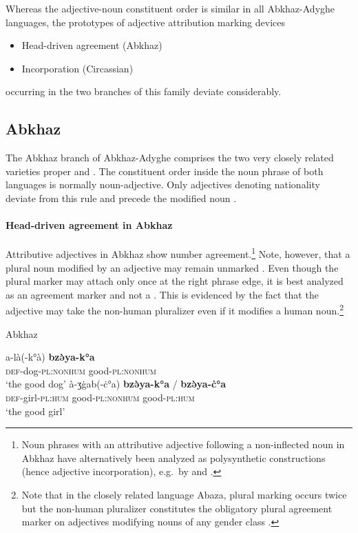 Whereas the adjective-noun constituent order is similar in all Abkhaz-Adyghe languages, the prototypes of adjective attribution marking devices
\begin{itemize}
\item Head\hyp{}driven agreement (Abkhaz)
\item Incorporation (Circassian)
\end{itemize}
occurring in the two branches of this family deviate considerably.

\subsection{Abkhaz}
The Abkhaz branch of Abkhaz-Adyghe comprises the two very closely related varieties  proper and . The constituent order inside the noun phrase of both languages is normally noun-adjective. Only adjectives denoting nationality deviate from this rule and precede the modified noun \citep[222]{comrie1981}.

\paragraph*{Head\hyp{}driven agreement in Abkhaz}
Attributive adjectives in Abkhaz show number agreement.\footnote{Noun phrases with an attributive adjective following a non-inflected noun in Abkhaz have alternatively been analyzed as polysynthetic constructions (hence adjective incorporation), e.g.~by \citet[123]{rijkhoff2002} and \citet{gil2005}.} Note, however, that a plural noun modified by an adjective may remain unmarked \citep[46]{hewitt1989a}. Even though the plural marker may attach only once at the right phrase edge, it is best analyzed as an agreement marker and not a . This is evidenced by the fact that the adjective may take the non-human pluralizer even if it modifies a human noun.\footnote{Note that in the closely related language Abaza, plural marking occurs twice but the non-human pluralizer constitutes the obligatory plural agreement marker on adjectives modifying nouns of any gender class \cite[100]{lomtatidze-etal1989}.}
\begin{exe}
\ex \rm{Abkhaz \citep{hewitt1989a}}
\begin{xlist}
\ex
\gll	a-là(-k°à) \textbf{bzə̀ya-k°a}\\
	\textsc{def}-dog-\textsc{pl:nonhum} good-\textsc{pl:nonhum}\\
\glt	‘the good dog’
\ex	
\gll	à-ʒġab(-ċ°a) \textbf{bzə̀ya-k°a} / \textbf{bzə̀ya-ċ°a}\\
	\textsc{def}-girl-\textsc{pl:hum} good-\textsc{pl:nonhum} {} good-\textsc{pl:hum}\\
\glt	‘the good girl’
\end{xlist}
\end{exe}

